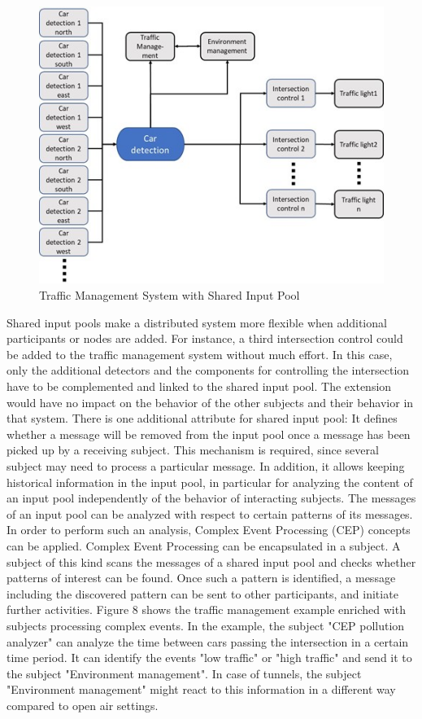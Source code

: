 \begin{figure}[htbp]
	\centering
	\includegraphics[width=0.7\linewidth]{Figures/Chapter5/figuresshared/SharedInputPoolExample.jpg}
	\caption[Traffic Management System with Shared Input Pool]{Traffic Management System with Shared Input Pool}
	\label{fig:SharedInputPooTraffic}
\end{figure}


Shared input pools make a distributed system more flexible when additional participants or nodes are added. For instance, a third intersection control could be added to the traffic management system without much effort. In this case, only the additional detectors and the components for controlling the intersection have to be complemented and linked to the shared input pool. The extension would have no impact on the behavior of the other subjects and their behavior in that system.
There is one additional attribute for shared input pool: It defines whether a message will be removed from the input pool once a message has been picked up by a receiving subject. This mechanism is required, since several subject may need to process a particular message. In addition, it allows keeping historical information in the input pool, in particular for analyzing the content of an input pool independently of the behavior of interacting subjects. 
The messages of an input pool can be analyzed with respect to certain patterns of its messages. In order to perform such an analysis, Complex Event Processing (CEP) concepts can be applied. Complex Event Processing can be encapsulated in a subject. A subject of this kind scans the messages of a shared input pool and checks whether patterns of interest can be found. Once such a pattern is identified, a message including the discovered pattern can be sent to other participants, and initiate further activities. Figure 8 shows the traffic management example enriched with subjects processing complex events.
In the example, the subject "CEP pollution analyzer" can analyze the time between cars passing the intersection in a certain time period. It can identify the events "low traffic" or "high traffic" and send it to the subject "Environment management". In case of tunnels, the subject "Environment management" might react to this information in a different way compared to open air settings. 


